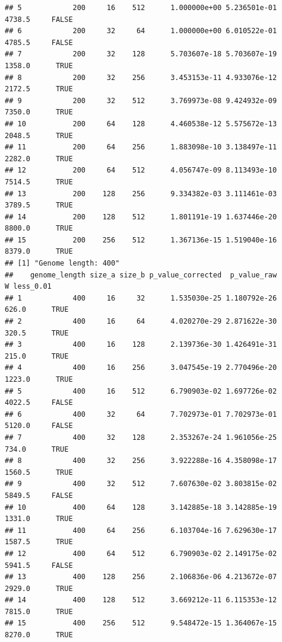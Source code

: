 \documentclass[]{book}
\begin{document}
\begin{verbatim}
## 5            200     16    512      1.000000e+00 5.236501e-01 4738.5     FALSE
## 6            200     32     64      1.000000e+00 6.010522e-01 4785.5     FALSE
## 7            200     32    128      5.703607e-18 5.703607e-19 1358.0      TRUE
## 8            200     32    256      3.453153e-11 4.933076e-12 2172.5      TRUE
## 9            200     32    512      3.769973e-08 9.424932e-09 7350.0      TRUE
## 10           200     64    128      4.460538e-12 5.575672e-13 2048.5      TRUE
## 11           200     64    256      1.883098e-10 3.138497e-11 2282.0      TRUE
## 12           200     64    512      4.056747e-09 8.113493e-10 7514.5      TRUE
## 13           200    128    256      9.334382e-03 3.111461e-03 3789.5      TRUE
## 14           200    128    512      1.801191e-19 1.637446e-20 8800.0      TRUE
## 15           200    256    512      1.367136e-15 1.519040e-16 8379.0      TRUE
## [1] "Genome length: 400"
##    genome_length size_a size_b p_value_corrected  p_value_raw      W less_0.01
## 1            400     16     32      1.535030e-25 1.180792e-26  626.0      TRUE
## 2            400     16     64      4.020270e-29 2.871622e-30  320.5      TRUE
## 3            400     16    128      2.139736e-30 1.426491e-31  215.0      TRUE
## 4            400     16    256      3.047545e-19 2.770496e-20 1223.0      TRUE
## 5            400     16    512      6.790903e-02 1.697726e-02 4022.5     FALSE
## 6            400     32     64      7.702973e-01 7.702973e-01 5120.0     FALSE
## 7            400     32    128      2.353267e-24 1.961056e-25  734.0      TRUE
## 8            400     32    256      3.922288e-16 4.358098e-17 1560.5      TRUE
## 9            400     32    512      7.607630e-02 3.803815e-02 5849.5     FALSE
## 10           400     64    128      3.142885e-18 3.142885e-19 1331.0      TRUE
## 11           400     64    256      6.103704e-16 7.629630e-17 1587.5      TRUE
## 12           400     64    512      6.790903e-02 2.149175e-02 5941.5     FALSE
## 13           400    128    256      2.106836e-06 4.213672e-07 2929.0      TRUE
## 14           400    128    512      3.669212e-11 6.115353e-12 7815.0      TRUE
## 15           400    256    512      9.548472e-15 1.364067e-15 8270.0      TRUE
\end{verbatim}
\end{document}

